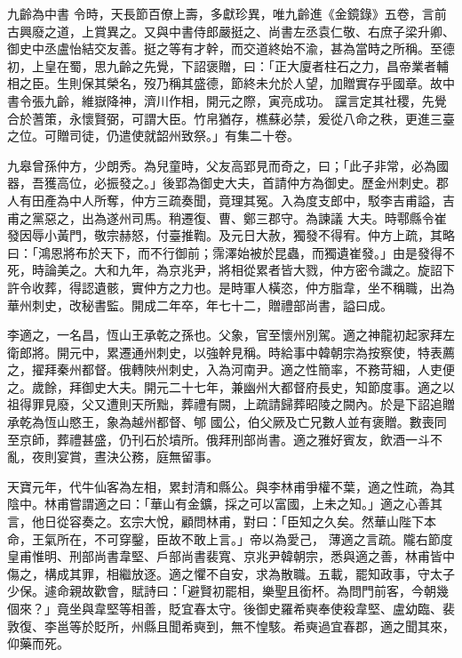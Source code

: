 \begin{pinyinscope}
 九齡為中書
 令時，天長節百僚上壽，多獻珍異，唯九齡進《金鏡錄》五卷，言前古興廢之道，上賞異之。又與中書侍郎嚴挺之、尚書左丞袁仁敬、右庶子梁升卿、御史中丞盧怡結交友善。挺之等有才幹，而交道終始不渝，甚為當時之所稱。至德初，上皇在蜀，思九齡之先覺，下詔褒贈，曰：「正大廈者柱石之力，昌帝業者輔相之臣。生則保其榮名，歿乃稱其盛德，節終未允於人望，加贈實存乎國章。故中書令張九齡，維嶽降神，濟川作相，開元之際，寅亮成功。
 讜言定其社稷，先覺合於蓍策，永懷賢弼，可謂大臣。竹帛猶存，樵蘇必禁，爰從八命之秩，更進三臺之位。可贈司徒，仍遣使就韶州致祭。」有集二十卷。



 九皋曾孫仲方，少朗秀。為兒童時，父友高郢見而奇之，曰；「此子非常，必為國器，吾獲高位，必振發之。」後郢為御史大夫，首請仲方為御史。歷金州刺史。郡人有田產為中人所奪，仲方三疏奏聞，竟理其冤。入為度支郎中，駁李吉甫謚，吉甫之黨惡之，出為遂州司馬。稍遷復、曹、鄭三郡守。為諫議
 大夫。時鄠縣令崔發因辱小黃門，敬宗赫怒，付臺推鞫。及元日大赦，獨發不得宥。仲方上疏，其略曰：「鴻恩將布於天下，而不行御前；霈澤始被於昆蟲，而獨遺崔發。」由是發得不死，時論美之。大和九年，為京兆尹，將相從累者皆大戮，仲方密令識之。旋詔下許令收葬，得認遺骸，實仲方之力也。是時軍人橫恣，仲方脂韋，坐不稱職，出為華州刺史，改秘書監。開成二年卒，年七十二，贈禮部尚書，謚曰成。



 李適之，一名昌，恆山王承乾之孫也。父象，官至懷州別駕。適之神龍初起家拜左衛郎將。開元中，累遷通州刺史，以強幹見稱。時給事中韓朝宗為按察使，特表薦之，擢拜秦州都督。俄轉陜州刺史，入為河南尹。適之性簡率，不務苛細，人吏便之。歲餘，拜御史大夫。開元二十七年，兼幽州大都督府長史，知節度事。適之以祖得罪見廢，父又遭則天所黜，葬禮有闕，上疏請歸葬昭陵之闕內。於是下詔追贈承乾為恆山愍王，象為越州都督、郇
 國公，伯父厥及亡兄數人並有褒贈。數喪同至京師，葬禮甚盛，仍刊石於墳所。俄拜刑部尚書。適之雅好賓友，飲酒一斗不亂，夜則宴賞，晝決公務，庭無留事。



 天寶元年，代牛仙客為左相，累封清和縣公。與李林甫爭權不葉，適之性疏，為其陰中。林甫嘗謂適之曰：「華山有金鑛，採之可以富國，上未之知。」適之心善其言，他日從容奏之。玄宗大悅，顧問林甫，對曰：「臣知之久矣。然華山陛下本命，王氣所在，不可穿鑿，臣故不敢上言。」帝以為愛己，
 薄適之言疏。隴右節度皇甫惟明、刑部尚書韋堅、戶部尚書裴寬、京兆尹韓朝宗，悉與適之善，林甫皆中傷之，構成其罪，相繼放逐。適之懼不自安，求為散職。五載，罷知政事，守太子少保。遽命親故歡會，賦詩曰：「避賢初罷相，樂聖且銜杯。為問門前客，今朝幾個來？」竟坐與韋堅等相善，貶宜春太守。後御史羅希奭奉使殺韋堅、盧幼臨、裴敦復、李邕等於貶所，州縣且聞希奭到，無不惶駭。希奭過宜春郡，適之聞其來，仰藥而死。




\end{pinyinscope}
